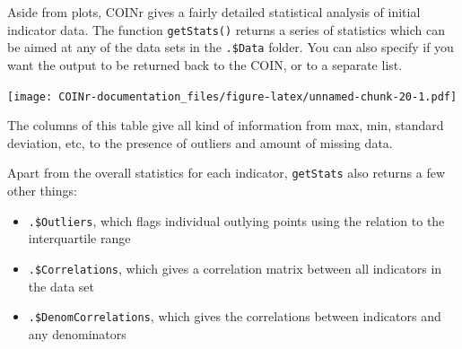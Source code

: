 \documentclass[
]{book}
\newenvironment{Shaded}{\begin{snugshade}}{\end{snugshade}}
\newcommand{\AttributeTok}[1]{\textcolor[rgb]{0.77,0.63,0.00}{#1}}
\newcommand{\CommentTok}[1]{\textcolor[rgb]{0.56,0.35,0.01}{\textit{#1}}}
\newcommand{\ConstantTok}[1]{\textcolor[rgb]{0.00,0.00,0.00}{#1}}
\newcommand{\DecValTok}[1]{\textcolor[rgb]{0.00,0.00,0.81}{#1}}
\newcommand{\DocumentationTok}[1]{\textcolor[rgb]{0.56,0.35,0.01}{\textbf{\textit{#1}}}}
\newcommand{\FunctionTok}[1]{\textcolor[rgb]{0.00,0.00,0.00}{#1}}
\newcommand{\NormalTok}[1]{#1}
\newcommand{\OtherTok}[1]{\textcolor[rgb]{0.56,0.35,0.01}{#1}}
\newcommand{\SpecialCharTok}[1]{\textcolor[rgb]{0.00,0.00,0.00}{#1}}
\newcommand{\StringTok}[1]{\textcolor[rgb]{0.31,0.60,0.02}{#1}}
\providecommand{\tightlist}{%
  \setlength{\itemsep}{0pt}\setlength{\parskip}{0pt}}
\begin{document}
Aside from plots, COINr gives a fairly detailed statistical analysis of initial indicator data. The function \texttt{getStats()} returns a series of statistics which can be aimed at any of the data sets in the \texttt{.\$Data} folder. You can also specify if you want the output to be returned back to the COIN, or to a separate list.

\begin{Shaded}
\end{Shaded}

\texttt{[image: COINr-documentation\_files/figure-latex/unnamed-chunk-20-1.pdf]}

The columns of this table give all kind of information from max, min, standard deviation, etc, to the presence of outliers and amount of missing data.

Apart from the overall statistics for each indicator, \texttt{getStats} also returns a few other things:

\begin{itemize}
\tightlist
\item
  \texttt{.\$Outliers}, which flags individual outlying points using the relation to the interquartile range
\item
  \texttt{.\$Correlations}, which gives a correlation matrix between all indicators in the data set
\item
  \texttt{.\$DenomCorrelations}, which gives the correlations between indicators and any denominators
\end{itemize}
\end{document}
